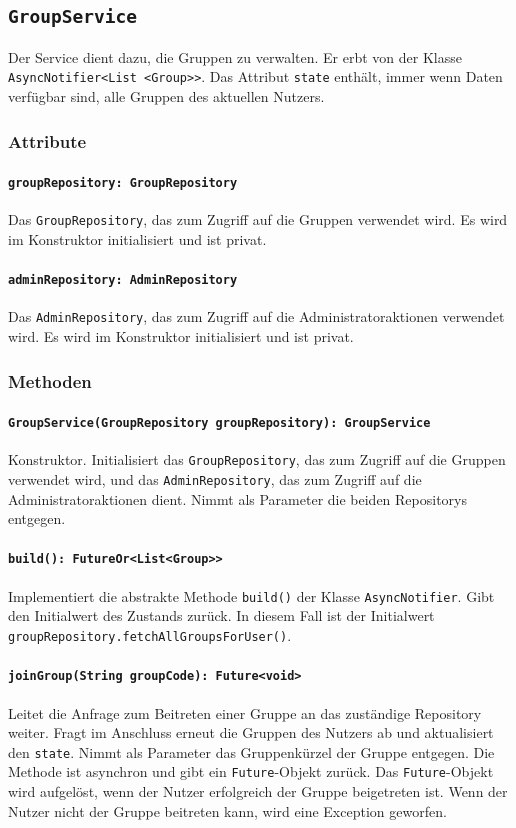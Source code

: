 \documentclass{entwurfsheft}
\begin{document}
\begin{sloppypar}
\newpage
\subsection{\texttt{GroupService}}
\label{sec:groupService}
Der Service dient dazu, die Gruppen zu verwalten. Er erbt von der Klasse \texttt{AsyncNotifier<List <Group>>}. Das Attribut \texttt{state} enthält, immer wenn Daten verfügbar sind, alle Gruppen des aktuellen Nutzers.
\subsubsection*{Attribute}
\paragraph{\texttt{groupRepository: GroupRepository}}
Das \texttt{GroupRepository}, das zum Zugriff auf die Gruppen verwendet wird. Es wird im Konstruktor initialisiert und ist privat.
\paragraph{\texttt{adminRepository: AdminRepository}}
Das \texttt{AdminRepository}, das zum Zugriff auf die Administratoraktionen verwendet wird. Es wird im Konstruktor initialisiert und ist privat.
\subsubsection*{Methoden}
\paragraph{\texttt{GroupService(GroupRepository groupRepository): GroupService}}
Konstruktor. Initialisiert das \texttt{GroupRepository}, das zum Zugriff auf die Gruppen verwendet wird, und das \texttt{AdminRe\-pository}, das zum Zugriff auf die Administratoraktionen dient. Nimmt als Parameter die beiden Repositorys entgegen.
\paragraph{\texttt{build(): FutureOr<List<Group>>}}
Implementiert die abstrakte Methode \texttt{build()} der Klasse \texttt{AsyncNotifier}. Gibt den Initialwert des Zustands zurück. In diesem Fall ist der Initialwert \texttt{groupRepository.fetchAllGroupsForUser()}.
\paragraph{\texttt{joinGroup(String groupCode): Future<void>}}
Leitet die Anfrage zum Beitreten einer Gruppe an das zuständige Repository weiter. Fragt im Anschluss erneut die Gruppen des Nutzers ab und aktualisiert den \texttt{state}. Nimmt als Parameter das Gruppenkürzel der Gruppe entgegen. Die Methode ist asynchron und gibt ein \texttt{Future}-Objekt zurück. Das \texttt{Future}-Objekt wird aufgelöst, wenn der Nutzer erfolgreich der Gruppe beigetreten ist. Wenn der Nutzer nicht der Gruppe beitreten kann, wird eine Exception geworfen.

\end{sloppypar}
\end{document}
